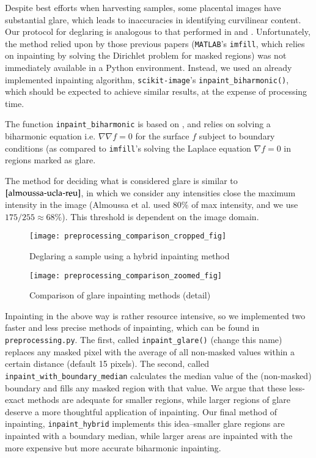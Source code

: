 	Despite best efforts when harvesting samples, some placental images have substantial glare, which leads to inaccuracies in identifying curvilinear content. Our protocol for deglaring is analogous to that performed in \cite{almoussa-ucla-reu} and \cite{huynh2013filter}. Unfortunately, the method relied upon by those previous papers (\texttt{MATLAB}'s \texttt{imfill}, which relies on inpainting by solving the Dirichlet problem for masked regions) was not immediately available in a Python environment. Instead, we used an already implemented inpainting algorithm, \texttt{scikit-image}'s \texttt{inpaint\_biharmonic()}, which should be expected to achieve similar results, at the expense of processing time.
	
	The function \texttt{inpaint\_biharmonic} is based on \cite{damelin2018surface}, and relies on solving a
	biharmonic equation i.e. $\nabla \nabla f = 0$ for the surface $f$ subject to boundary conditions (as
	compared to \texttt{imfill}'s solving the Laplace equation $\nabla f = 0$ in regions marked as glare.
	
	The method for deciding what is considered glare is similar to $\cite{almoussa-ucla-reu}$, in which we
	consider any intensities close the maximum intensity in the image (Almoussa et al. used $80\%$ of max intensity, and we use $175/255 \approx 68\%$). This threshold is dependent on the image domain.
	
		\begin{figure} 
		\texttt{[image: preprocessing\_comparison\_cropped\_fig]}
		\caption{Deglaring a sample using a hybrid inpainting method}
		\label{fig:glare-example-crop}
		\end{figure}

		\begin{figure} 
		\texttt{[image: preprocessing\_comparison\_zoomed\_fig]}
		\caption{Comparison of glare inpainting methods (detail)}
		\label{fig:glare-example-zoom}
		\end{figure}
	
	Inpainting in the above way is rather resource intensive, so we implemented two faster and less precise methods of inpainting, which can be found in \texttt{preprocessing.py}. The first, called 
	\texttt{inpaint\_glare()} (change this name) replaces any masked pixel with the average of all non-masked values within a certain distance (default 15 pixels). The second, called \texttt{inpaint\_with\_boundary\_median} calculates the median value of the  (non-masked) boundary and fills any masked region with that value. We argue that these less-exact methods are adequate for smaller regions, while larger regions of glare deserve a more thoughtful application of inpainting. Our final method of inpainting, \texttt{inpaint\_hybrid} implements this idea--smaller glare regions are inpainted with a boundary median, while larger areas are inpainted with the more expensive but more accurate biharmonic inpainting.
	
